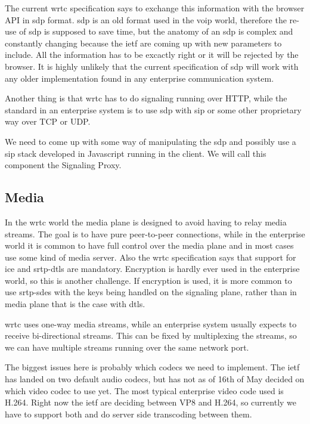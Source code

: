 The current \gls{wrtc} specification says to exchange this information with the browser API in \gls{sdp} format. \gls{sdp} is an old format used in the \gls{voip} world, therefore the re-use of \gls{sdp} is supposed to save time, but the anatomy of an \gls{sdp} is complex and constantly changing because the \gls{ietf} are coming up with new parameters to include. All the information has to be excactly right or it will be rejected by the browser. It is highly unlikely that the current specification of \gls{sdp} will work with any older implementation found in any enterprise communication system.

Another thing is that \gls{wrtc} has to do signaling running over HTTP, while the standard in an enterprise system is to use \gls{sdp} with \gls{sip} or some other proprietary way over TCP or UDP.

We need to come up with some way of manipulating the \gls{sdp} and possibly use a \gls{sip} stack developed in Javascript running in the client. We will call this component the Signaling Proxy.

\subsection{Media}
In the \gls{wrtc} world the media plane is designed to avoid having to relay media streams. The goal is to have pure peer-to-peer connections, while in the enterprise world it is common to have full control over the media plane and in most cases use some kind of media server. Also the \gls{wrtc} specification says that support for \gls{ice} and \gls{srtp}-\gls{dtls} are mandatory. Encryption is hardly ever used in the enterprise world, so this is another challenge. If encryption is used, it is more common to use \gls{srtp}-\gls{sdes} with the keys being handled on the signaling plane, rather than in media plane that is the case with \gls{dtls}.

\gls{wrtc} uses one-way media streams, while an enterprise system usually expects to receive bi-directional streams. This can be fixed by multiplexing the streams, so we can have multiple streams running over the same network port.

The biggest issues here is probably which codecs we need to implement. The \gls{ietf} has landed on two default audio codecs, but has not as of 16th of May decided on which video codec to use yet. The most typical enterprise video code used is H.264. Right now the \gls{ietf} are deciding between VP8 and H.264, so currently we have to support both and do server side transcoding between them.

